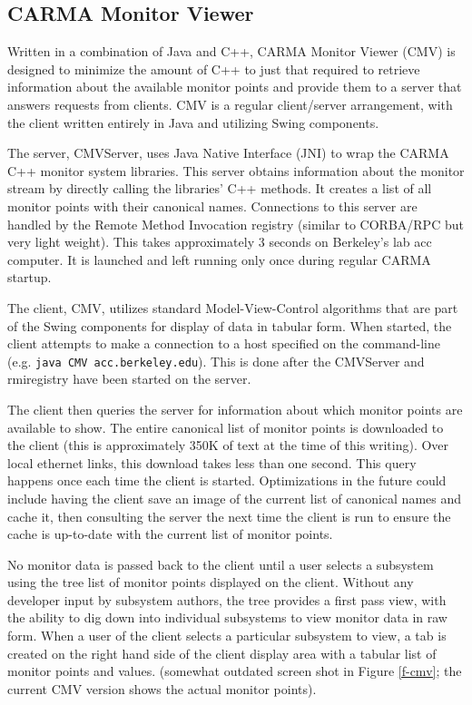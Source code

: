 \documentclass[preprint]{aastex}
\begin{document}
\subsection{CARMA Monitor Viewer}

Written in a combination of Java and C++, CARMA Monitor Viewer (CMV)
is designed to minimize the amount of C++ to just that required to
retrieve information about the available monitor points and provide
them to a server that answers requests from clients.  CMV is a regular
client/server arrangement, with the client written entirely in Java and
utilizing Swing components.

The server, CMVServer, uses Java Native Interface (JNI) to wrap the CARMA C++
monitor system libraries.  This server obtains information about
the monitor stream by directly calling the libraries' C++ methods.
It creates a list of all monitor points with their canonical names.
Connections to this server are handled by the Remote Method Invocation
registry (similar to CORBA/RPC but very light weight).
This takes approximately 3 seconds on Berkeley's lab acc computer.
It is launched and left running only once during regular CARMA 
startup.

The client, CMV, utilizes standard Model-View-Control algorithms that
are part of the Swing components for display of data in tabular form.
When started, the client attempts to make a connection to a host
specified on the command-line (e.g. {\tt java CMV acc.berkeley.edu}).
This is done after the CMVServer 
and rmiregistry have been started on the server.

The client then queries the server for information about which monitor
points are available to show.  The entire canonical list of monitor
points is downloaded to the client (this is approximately 350K of text
at the time of this writing).  Over local ethernet links, this download
takes less than one second.  This query happens once each time the client
is started.  Optimizations in the future could include having the client
save an image of the current list of canonical names and cache it, then
consulting the server the next time the client is run to ensure the cache
is up-to-date with the current list of monitor points.

No monitor data is passed back to the client until a user selects
a subsystem using the tree list of monitor points displayed on the
client.  Without any developer input by subsystem authors, the
tree provides a first pass view, with the ability to dig down into
individual subsystems to view monitor data in raw form.
When a user of the client selects a particular subsystem to view,
a tab is created on the right hand side of the client display area
with a tabular list of monitor points and values.
(somewhat outdated screen shot in Figure \ref{f-cmv}; the
current CMV version shows the actual monitor points).
\end{document}
